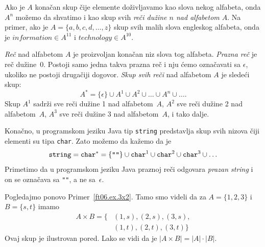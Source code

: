 \begin{EX}\label{ft06.ex.A-star}
  Ako je $A$ kona\v can skup \v cije elemente do\v zivljavamo kao slova nekog alfabeta, onda $A^n$ mo\v zemo da shvatimo i kao
  skup svih \emph{re\v ci du\v zine $n$ nad alfabetom $A$}. Na primer, ako je $A = \{a, b, c, d, \ldots, z\}$ skup svih
  malih slova engleskog alfabeta, onda je $\mathit{information} \in A^{11}$ i $\mathit{technology} \in A^{10}$.

  \emph{Re\v c} nad alfabetom $A$ je proizvoljan kona\v can niz slova tog alfabeta. \emph{Prazna re\v c} je re\v c
  du\v zine~0. Postoji samo jedna takva prazna re\v c i nju \'cemo ozna\v cavati sa $\epsilon$, ukoliko ne postoji druga\v ciji
  dogovor. \emph{Skup svih re\v ci} nad alfabetom $A$ je slede\'ci skup:
  $$
    A^* = \{\epsilon\} \cup A^1 \cup A^2 \cup \ldots \cup A^n \cup \ldots.
  $$
  Skup $A^1$ sadr\v zi sve re\v ci du\v zine 1 nad alfabetom~$A$,
  $A^2$ sve re\v ci du\v zine 2 nad alfabetom~$A$,
  $A^3$ sve re\v ci du\v zine 3 nad alfabetom~$A$, i tako dalje.
  
  Kona\v cno, u programskom jeziku Java tip \texttt{string} predstavlja skup svih nizova \v ciji elementi
  su tipa \texttt{char}. Zato mo\v zemo da ka\v zemo da je
  $$
    \mathtt{string} = \mathtt{char}^* = \{\hbox{\verb+""+}\} \cup \mathtt{char}^1 \cup \mathtt{char}^2 \cup \mathtt{char}^3 \cup \ldots
  $$
  Primetimo da u programskom jeziku Java praznoj re\v ci odgovara \emph{prazan string}
  i on se ozna\v cava sa \verb+""+, a ne sa~$\epsilon$.
\end{EX}

\noindent
\begin{minipage}{3in}
\begin{EX}
  Pogledajmo ponovo Primer~\ref{ft06.ex.3x2}. Tamo smo videli da za
  $A = \{1, 2, 3\}$ i $B = \{s, t\}$ imamo
  \begin{align*}
  A \times B = \{ &(1,s), (2,s), (3,s),\\
                  &(1,t), (2,t), (3,t)\}
  \end{align*}
  Ovaj skup je ilustrovan pored. Lako se vidi da je $|A \times B| = |A| \cdot |B|$.
\end{EX}
\end{minipage}
\hfill
\begin{minipage}{2.5in}
  \begin{center}
    
  \end{center}
\end{minipage}

